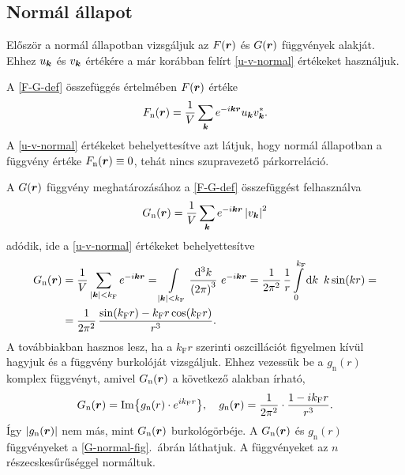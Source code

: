 \documentclass[a4paper,12pt,titlepage]{article}
\newcommand{\KK}{{\vb*{k}}}
\newcommand{\RR}{{\vb*{r}}}
\newcommand{\kF}{{k_\text{F}}}
\begin{document}
\subsection{Normál állapot}

Először a normál állapotban vizsgáljuk az $F(\RR)$ és $G(\RR)$ függvények alakját.  Ehhez $u_\KK$ és $v_\KK$ értékére a már korábban felírt \eqref{u-v-normal} értékeket használjuk.

A \eqref{F-G-def} összefüggés értelmében $F(\RR)$ értéke
\begin{equation}
	F_\text{n}(\RR) = \frac{1}{V} \sum\limits_\KK e^{-i \KK \RR} u_\KK v_\KK^*.
\end{equation}
A \eqref{u-v-normal} értékeket behelyettesítve azt látjuk, hogy normál állapotban a függvény értéke $F_\text{n}(\RR) \equiv 0$, tehát nincs szupravezető párkorreláció.


A $G(\RR)$ függvény meghatározásához a \eqref{F-G-def} összefüggést felhasználva
\begin{equation}
	G_\text{n}(\RR) = \frac{1}{V} \sum\limits_\KK e^{-i \KK \RR} \left| v_\KK \right|^2
\end{equation}
adódik, ide a \eqref{u-v-normal} értékeket behelyettesítve
\begin{equation}
\begin{split}
	G_\text{n}(\RR) & = \frac{1}{V} \sum\limits_{\left| \KK \right| < \kF} e^{-i \KK \RR} = \int\limits_{\left| \KK \right| < \kF} \frac{\dd[3]k}{\left( 2 \pi \right)^3} ~ e^{-i \KK \RR} = \frac{1}{2 \pi^2} \, \frac{1}{r} \int\limits_0^{\kF} \dd{k} ~ k \sin(k r) = \\
	& = \frac{1}{2 \pi^2} \, \frac{\sin(\kF r) - \kF r \cos(\kF r)}{r^3}.
\end{split}
\end{equation}
A továbbiakban hasznos lesz, ha a $\kF r$ szerinti oszcillációt figyelmen kívül hagyjuk és a függvény burkolóját vizsgáljuk.  Ehhez vezessük be a $g_\text{n}(r)$ komplex függvényt, amivel $G_\text{n}(\RR)$ a következő alakban írható,
\begin{equation}
	G_\text{n}(\RR) = \Im{g_\text{n}(r) \cdot e^{i \kF r}}, ~~~ g_\text{n}(\RR) = \frac{1}{2 \pi^2} \cdot \frac{1 - i \kF r}{r^3}.
\end{equation}
Így $\left| g_\text{n}(\RR) \right|$ nem más, mint $G_\text{n}(\RR)$ burkológörbéje.  A $G_\text{n}(\RR)$ és $g_\text{n}(r)$ függvényeket a \ref{G-normal-fig}.\ ábrán láthatjuk.  A függvényeket az $n$ részecskesűrűséggel normáltuk.
\end{document}
